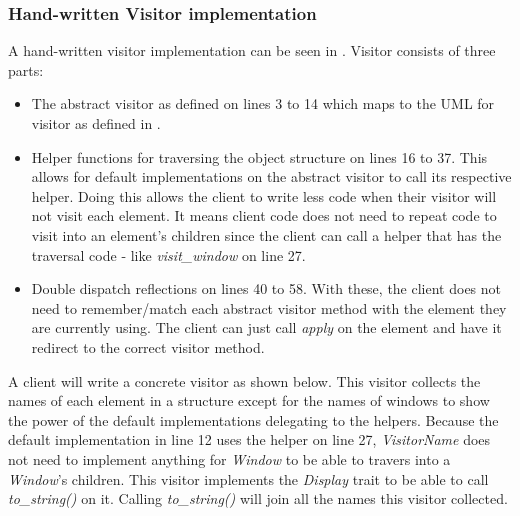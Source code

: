 
\subsubsection{Hand-written Visitor implementation}
\label{sec:visitor-hand-written}
A hand-written visitor implementation can be seen in .
Visitor consists of three parts:
\begin{itemize}
	\item The abstract visitor as defined on lines 3 to 14 which maps to the UML for visitor as defined in .
	\item Helper functions for traversing the object structure \cite{gamma_94_01} on lines 16 to 37.
	      This allows for default implementations on the abstract visitor to call its respective helper.
	      Doing this allows the client to write less code when their visitor will not visit each element.
	      It means client code does not need to repeat code to visit into an element's children since the client can call a helper that has the traversal code - like \textit{visit\_window} on line 27.
	\item Double dispatch reflections on lines 40 to 58.
	      With these, the client does not need to remember/match each abstract visitor method with the element they are currently using.
	      The client can just call \textit{apply} on the element and have it redirect to the correct visitor method.
\end{itemize}


A client will write a concrete visitor as shown below.
This visitor collects the names of each element in a structure except for the names of windows to show the power of the default implementations delegating to the helpers.
Because the default implementation in  line 12 uses the helper on line 27, \textit{VisitorName} does not need to implement anything for \textit{Window} to be able to travers into a \textit{Window}'s children.
This visitor implements the \textit{Display} trait to be able to call \textit{to\_string()} on it.
Calling \textit{to\_string()} will join all the names this visitor collected.


